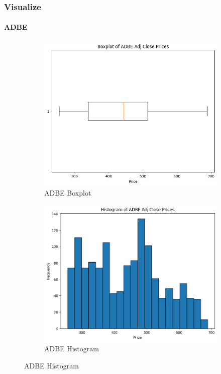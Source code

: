 \documentclass{ieeeojies}
\begin{document}
\subsubsection{Visualize}
\paragraph{ADBE}
\begin{figure}[H]
    \begin{subfigure}{0.4\linewidth}
        \centering
        \includegraphics[width=\linewidth]{ADBE1.png}
        \caption{ADBE Boxplot}
        \label{fig:adbe-7-3}
    \end{subfigure}%
    \hfill
    \begin{subfigure}{0.4\linewidth}
        \centering
        \includegraphics[width=\linewidth]{ADBE2.png}
        \caption{ADBE Histogram}
        \label{fig:adbe-8-2}
    \end{subfigure}%
\end{figure}
\end{document}
